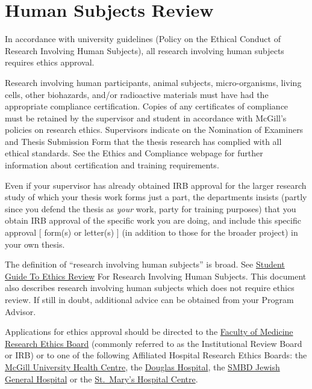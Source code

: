 \documentclass[
]{book}
\begin{document}
\hypertarget{human-subjects-review}{%
\section{Human Subjects Review}\label{human-subjects-review}}

In accordance with university guidelines (Policy on the Ethical Conduct of Research Involving Human Subjects), all research involving human subjects requires ethics approval.

Research involving human participants, animal subjects, micro-organisms, living cells, other biohazards, and/or radioactive materials must have had the appropriate compliance certification. Copies of any certificates of compliance must be retained by the supervisor and student in accordance with McGill's policies on research ethics. Supervisors indicate on the Nomination of Examiners and Thesis Submission Form that the thesis research has complied with all ethical standards. See the Ethics and Compliance webpage for further information about certification and training requirements.

Even if your supervisor has already obtained IRB approval for the larger research study of which your thesis work forms just a part, the departments insists (partly since you defend the thesis as \emph{your} work, party for training purposes) that you obtain IRB approval of the specific work you are doing, and include this specific approval {[} form(s) or letter(s) {]} (in addition to those for the broader project) in your own thesis.

The definition of ``research involving human subjects'' is broad. See \href{https://www.mcgill.ca/research/researchers/compliance/human}{Student Guide To Ethics Review} For Research Involving Human Subjects. This document also describes research involving human subjects which does not require ethics review. If still in doubt, additional advice can be obtained from your Program Advisor.

Applications for ethics approval should be directed to the \href{https://www.mcgill.ca/medresearch/ethics}{Faculty of Medicine Research Ethics Board} (commonly referred to as the Institutional Review Board or IRB) or to one of the following Affiliated Hospital Research Ethics Boards: the \href{https://muhc.ca/cae/page/research-ethics}{McGill University Health Centre}, the \href{http://www.douglas.qc.ca/page/ethics}{Douglas Hospital}, the \href{http://www.jgh.ca/en/ResearchEthicsCommittee}{SMBD Jewish General Hospital} or the \href{http://www.stmarysresearch.ca/en/research_review/research-review}{St.~Mary's Hospital Centre}.
\end{document}
